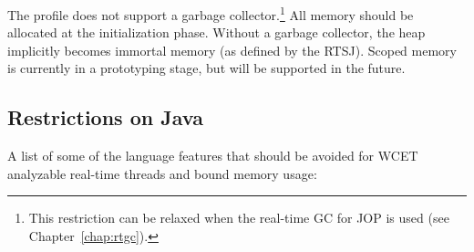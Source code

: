 The profile does not support a garbage collector.\footnote{This
restriction can be relaxed when the real-time GC for JOP is used (see
Chapter~\ref{chap:rtgc}).} All memory should be allocated at the
initialization phase. Without a garbage collector, the heap
implicitly becomes immortal memory (as defined by the RTSJ).
Scoped memory is currently in a prototyping stage, but will be
supported in the future.


\subsection{Restrictions on Java}

A list of some of the language features that should be avoided for
WCET analyzable real-time threads and bound memory usage:

